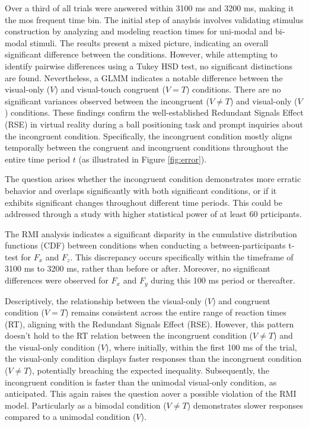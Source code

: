 \documentclass[12pt,oneside,openright]{report}
\begin{document}
Over a third of all trials were answered within 3100 ms and 3200 ms, making it the mos frequent time bin. The initial step of anaylsis involves validating stimulus construction by analyzing and modeling reaction times for uni-modal and bi-modal stimuli. The results present a mixed picture, indicating an overall significant difference between the conditions. However, while attempting to identify pairwise differences using a Tukey HSD test, no significant distinctions are found. Nevertheless, a GLMM indicates a notable difference between the visual-only ($V$) and visual-touch congruent ($V=T$) conditions. There are no significant variances observed between the incongruent ($V \neq T$) and visual-only ($V$) conditions. These findings confirm the well-established Redundant Signals Effect (RSE) in virtual reality during a ball positioning task and prompt inquiries about the incongruent condition. Specifically, the incongruent condition mostly aligns temporally between the congruent and incongruent conditions throughout the entire time period $t$ (as illustrated in Figure \ref{fig:error}).

The question arises whether the incongruent condition demonstrates more erratic behavior and overlaps significantly with both significant conditions, or if it exhibits significant changes throughout different time periods. This could be addressed through a study with higher statistical power of  at least 60 prticipants.

The RMI analysis indicates a significant disparity in the cumulative distribution functions (CDF) between conditions when conducting a between-participants t-test for $F_x$ and $F_z$. This discrepancy occurs specifically within the timeframe of 3100 ms to 3200 ms, rather than before or after. Moreover, no significant differences were observed for $F_x$ and $F_y$ during this 100 ms period or thereafter. 

Descriptively, the relationship between the visual-only ($V$) and congruent condition ($V=T$) remains consistent across the entire range of reaction times (RT), aligning with the Redundant Signals Effect (RSE). However, this pattern doesn’t hold to the RT relation between the incongruent condition ($V \neq T$) and the visual-only condition ($V$), where initially, within the first 100 ms of the trial, the visual-only condition displays faster responses than the incongruent condition ($V \neq T$), potentially breaching the expected inequality. Subsequently, the incongruent condition is faster than the unimodal visual-only condition, as anticipated. This again raises the question aover a possible violation of the RMI model. Particularly as a bimodal condition ($V \neq T$) demonstrates slower responses compared to a unimodal condition ($V$).
\end{document}
